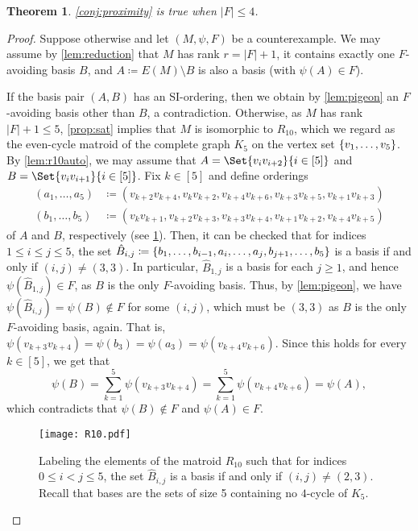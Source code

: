 \documentclass{article}
\DeclarePairedDelimiter{\set}{\{}{\}}
\newtheorem{theorem}{Theorem}[section]
\theoremstyle{definition}
\begin{document}
\begin{theorem} \label{thm:four-forbidden}
\cref{conj:proximity} is true when $|F| \le 4$.
\end{theorem}
\begin{proof} 
Suppose otherwise and let $(M, \psi, F)$ be a counterexample. We may assume by \cref{lem:reduction} that $M$ has rank $r = |F|+1$, it contains exactly one $F$-avoiding basis $B$, and $A \coloneqq E(M)\setminus B$ is also a basis (with $\psi(A) \in F$).


If the basis pair $(A, B)$ has an SI-ordering, then we obtain by \cref{lem:pigeon} an $F$-avoiding basis other than $B$, a contradiction.
Otherwise, as $M$ has rank $|F|+1\le 5$, \cref{prop:sat} implies that $M$ is isomorphic to $R_{10}$, which we regard as the even-cycle matroid of the complete graph $K_5$ on the vertex set $\set{v_1,\dots, v_5}$.
By \cref{lem:r10auto}, we may assume that $A=\Set{v_iv_{i+2}}{i \in [5]}$ and  $B=\Set{v_iv_{i+1}}{i \in [5]}$.
Fix $k \in [5]$ and define orderings
\begin{align}
(a_1,\dots, a_5) &\coloneqq  (v_{k+2}v_{k+4}, v_kv_{k+2}, v_{k+4}v_{k+6}, v_{k+3}v_{k+5}, v_{k+1}v_{k+3}) \\
(b_1,\dots, b_5) & \coloneqq (v_kv_{k+1}, v_{k+2}v_{k+3}, v_{k+3}v_{k+4}, v_{k+1}v_{k+2}, v_{k+4}v_{k+5})
\end{align}
of $A$ and $B$, respectively (see \cref{fig:r10}). Then, it can be checked that for indices $1 \le i \le j \le 5$, the set $\hat{B}_{i,j} \coloneqq \set{b_1,\dotsc, b_{i-1}, a_{i},\dotsc, a_j, b_{j+1},\dots, b_5}$ is a basis if and only if $(i,j)\ne (3,3)$.
In particular, $\hat{B}_{1,j}$ is a basis for each $j \ge 1$, and hence $\psi(\hat{B}_{1,j}) \in F$, as $B$ is the only $F$-avoiding basis.
Thus, by \cref{lem:pigeon}, we have $\psi(\hat{B}_{i,j}) = \psi(B) \notin F$ for some $(i, j)$, which must be $(3, 3)$ as $B$ is the only $F$-avoiding basis, again.
That is, $\psi(v_{k+3}v_{k+4}) = \psi(b_3) = \psi(a_3) = \psi(v_{k+4}v_{k+6})$.
Since this holds for every $k \in [5]$, we get that
\[\psi(B) = \sum_{k=1}^5 \psi(v_{k+3}v_{k+4}) = \sum_{k=1}^5 \psi(v_{k+4}v_{k+6}) = \psi(A),\]
which contradicts that $\psi(B) \notin F$ and $\psi(A) \in F$.

\begin{figure}[h!]
\centering
\texttt{[image: R10.pdf]}
\caption{Labeling the elements of the matroid $R_{10}$ such that for indices $0 \le i < j \le 5$, the set $\hat{B}_{i,j}$ is a basis if and only if $(i,j)\ne (2,3)$. Recall that bases are the sets of size 5 containing no $4$-cycle of $K_5$.} \label{fig:r10}
\end{figure}

\end{proof}
\end{document}

